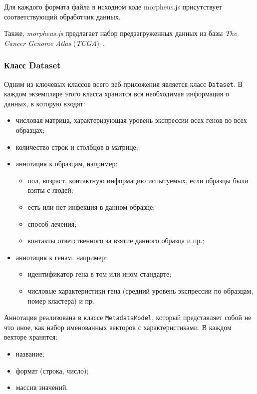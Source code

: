 Для каждого формата файла в исходном коде morpheus.js присутствует соответствующий обработчик данных.

Также, \emph{morpheus.js} предлагает набор предзагруженных данных из базы \emph{The Cancer Genome Atlas} (\emph{TCGA})~\cite{tcga}.

\subsubsection{Класс Dataset}
Одним из ключевых классов всего веб-приложения является класс \texttt{Dataset}. В каждом экземпляре этого класса хранится вся необходимая информация о данных, в которую входят:

\begin{itemize}
\item числовая матрица, характеризующая уровень экспрессии всех генов во всех образцах;
\item количество строк и столбцов в матрице;
\item аннотация к образцам, например:\begin{itemize}
\item пол, возраст, контактную информацию испытуемых, если образцы были взяты с людей;
\item есть или нет инфекция в данном образце;
    \item способ лечения;
    \item  контакты ответственного за взятие данного образца и пр.;\end{itemize}
\item аннотация к генам, например:\begin{itemize}
    \item идентификатор гена в том или ином стандарте;
    \item числовые характеристики гена (средний уровень экспрессии по образцам, номер кластера) и пр.\end{itemize}
\end{itemize}

Аннотация реализована в классе \texttt{MetadataModel}, который представляет собой не что иное, как набор именованных векторов с характеристиками. В каждом векторе хранятся:

\begin{itemize}
\item название;
\item формат (строка, число);
\item массив значений.
\end{itemize}

